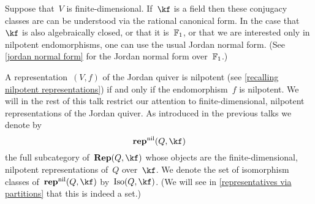 \documentclass[a4paper,11pt]{scrartcl}
\begin{document}
Suppose that~$V$ is finite-dimensional.
If~$\kf$ is a field then these conjugacy classes are can be understood via the rational canonical form.
In the case that~$\kf$ is also algebraically closed, or that it is~$\mathbb{F}_1$, or that we are interested only in nilpotent endomorphisms, one can use the usual Jordan normal form.
(See \cref{jordan normal form} for the Jordan normal form over~$\mathbb{F}_1$.)

A representation~$(V, f)$ of the Jordan quiver is nilpotent (see \cref{recalling nilpotent representations}) if and only if the endomorphism~$f$ is nilpotent.
We will in the rest of this talk restrict our attention to finite-dimensional, nilpotent representations of the Jordan quiver.
As introduced in the previous talks we denote by
\[
  \repnil(Q, \kf)
\]
the full subcategory of~$\Rep(Q, \kf)$ whose objects are the finite-dimensional, nilpotent representations of~$Q$ over~$\kf$.
We denote the set of isomorphism classes of~$\repnil(Q, \kf)$ by~$\Iso(Q, \kf)$.
(We will see in \cref{representatives via partitions} that this is indeed a set.)
\end{document}
